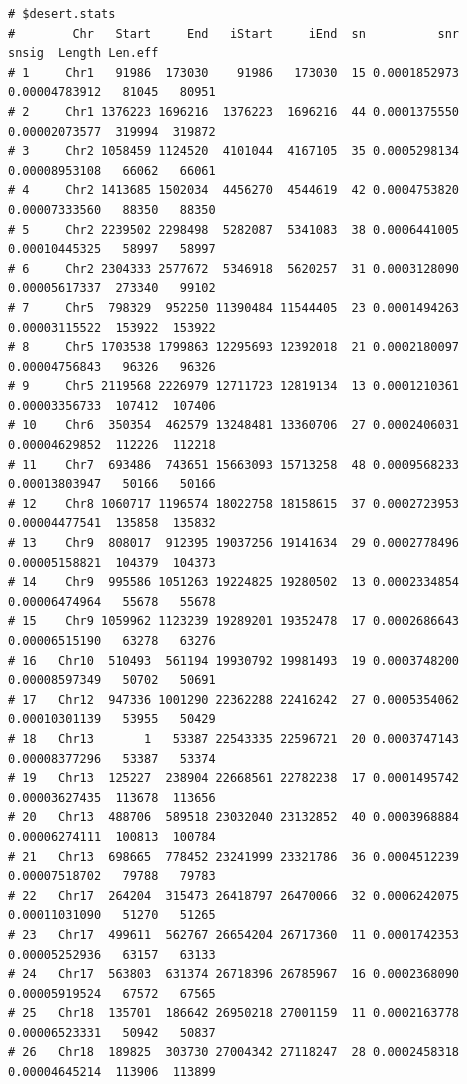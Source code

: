 \documentclass{article}\usepackage[]{graphicx}\usepackage[]{color}
\makeatletter
\newenvironment{kframe}{%
 \def\at@end@of@kframe{}%
 \ifinner\ifhmode%
  \def\at@end@of@kframe{\end{minipage}}%
  \begin{minipage}{\columnwidth}%
 \fi\fi%
 \def\FrameCommand##1{\hskip\@totalleftmargin \hskip-\fboxsep
 \colorbox{shadecolor}{##1}\hskip-\fboxsep
     \hskip-\linewidth \hskip-\@totalleftmargin \hskip\columnwidth}%
 \MakeFramed {\advance\hsize-\width
   \@totalleftmargin\z@ \linewidth\hsize
   \@setminipage}}%
 {\par\unskip\endMakeFramed%
 \at@end@of@kframe}
\newenvironment{knitrout}{}{} %
\makeatother
\begin{document}
\begin{knitrout}
\begin{kframe}\begin{verbatim}
# $desert.stats
#        Chr   Start     End   iStart     iEnd  sn          snr         snsig  Length Len.eff
# 1     Chr1   91986  173030    91986   173030  15 0.0001852973 0.00004783912   81045   80951
# 2     Chr1 1376223 1696216  1376223  1696216  44 0.0001375550 0.00002073577  319994  319872
# 3     Chr2 1058459 1124520  4101044  4167105  35 0.0005298134 0.00008953108   66062   66061
# 4     Chr2 1413685 1502034  4456270  4544619  42 0.0004753820 0.00007333560   88350   88350
# 5     Chr2 2239502 2298498  5282087  5341083  38 0.0006441005 0.00010445325   58997   58997
# 6     Chr2 2304333 2577672  5346918  5620257  31 0.0003128090 0.00005617337  273340   99102
# 7     Chr5  798329  952250 11390484 11544405  23 0.0001494263 0.00003115522  153922  153922
# 8     Chr5 1703538 1799863 12295693 12392018  21 0.0002180097 0.00004756843   96326   96326
# 9     Chr5 2119568 2226979 12711723 12819134  13 0.0001210361 0.00003356733  107412  107406
# 10    Chr6  350354  462579 13248481 13360706  27 0.0002406031 0.00004629852  112226  112218
# 11    Chr7  693486  743651 15663093 15713258  48 0.0009568233 0.00013803947   50166   50166
# 12    Chr8 1060717 1196574 18022758 18158615  37 0.0002723953 0.00004477541  135858  135832
# 13    Chr9  808017  912395 19037256 19141634  29 0.0002778496 0.00005158821  104379  104373
# 14    Chr9  995586 1051263 19224825 19280502  13 0.0002334854 0.00006474964   55678   55678
# 15    Chr9 1059962 1123239 19289201 19352478  17 0.0002686643 0.00006515190   63278   63276
# 16   Chr10  510493  561194 19930792 19981493  19 0.0003748200 0.00008597349   50702   50691
# 17   Chr12  947336 1001290 22362288 22416242  27 0.0005354062 0.00010301139   53955   50429
# 18   Chr13       1   53387 22543335 22596721  20 0.0003747143 0.00008377296   53387   53374
# 19   Chr13  125227  238904 22668561 22782238  17 0.0001495742 0.00003627435  113678  113656
# 20   Chr13  488706  589518 23032040 23132852  40 0.0003968884 0.00006274111  100813  100784
# 21   Chr13  698665  778452 23241999 23321786  36 0.0004512239 0.00007518702   79788   79783
# 22   Chr17  264204  315473 26418797 26470066  32 0.0006242075 0.00011031090   51270   51265
# 23   Chr17  499611  562767 26654204 26717360  11 0.0001742353 0.00005252936   63157   63133
# 24   Chr17  563803  631374 26718396 26785967  16 0.0002368090 0.00005919524   67572   67565
# 25   Chr18  135701  186642 26950218 27001159  11 0.0002163778 0.00006523331   50942   50837
# 26   Chr18  189825  303730 27004342 27118247  28 0.0002458318 0.00004645214  113906  113899

\end{verbatim}
\end{kframe}
\end{knitrout}
\end{document}
